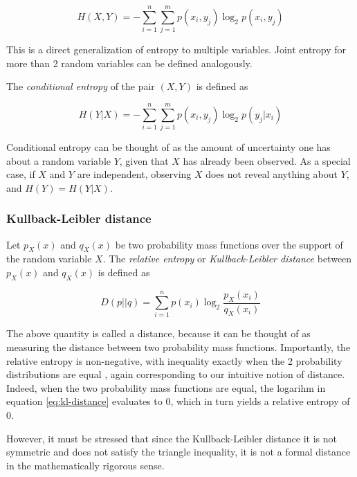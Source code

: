 \documentclass[12pt]{article}
\begin{document}
\begin{equation}
H(X,Y) = -\sum_{i=1}^n \sum_{j=1}^m p(x_i,y_j) \log_2 p(x_i,y_j)
\label{eq:cond-etropy}
\end{equation}

This is a direct generalization of entropy to multiple variables. Joint entropy for more than 2 random variables can be defined analogously.

The \textit{conditional entropy} \cite{cover-thomas} of the pair $(X,Y)$ is defined as 

\begin{equation}
H(Y|X) = - \sum_{i=1}^n \sum_{j=1}^m p(x_i,y_j) \log_2 p(y_j|x_i)
\end{equation}

Conditional entropy can be thought of as the amount of uncertainty one has about a random variable $Y$, given that $X$ has already been observed. As a special case, if $X$ and $Y$ are independent, observing $X$ does not reveal anything about $Y$, and $H(Y) = H(Y|X)$.

\subsubsection{Kullback-Leibler distance}

Let $p_X(x)$ and $q_X(x)$ be two probability mass functions over the support of the random variable $X$. The \textit{relative entropy} or \textit{Kullback-Leibler distance} \cite{cover-thomas} between $p_X(x)$ and $q_X(x)$ is defined as

\begin{equation}
D(p||q) = \sum_{i = 1}^n p(x_i) \log_2 \frac{p_X(x_i)}{q_X(x_i)}
\label{eq:kl-distance}
\end{equation} 

The above quantity is called a distance, because it can be thought of as measuring the distance between two probability mass functions. Importantly, the relative entropy is non-negative, with inequality exactly when the 2 probability distributions are equal \cite{cover-thomas}, again corresponding to our intuitive notion of distance. Indeed, when the two probability mass functions are equal, the logarihm in equation \ref{eq:kl-distance} evaluates to 0, which in turn yields a relative entropy of 0. 

However, it must be stressed that since the Kullback-Leibler distance it is not symmetric and does not satisfy the triangle inequality, it is not a formal distance in the mathematically rigorous sense.
\end{document}
